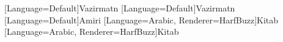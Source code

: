[Language=Default]{Vazirmatn}
[Language=Default]{Vazirmatn}
[Language=Default]{Amiri}
[Language=Arabic, Renderer=HarfBuzz]{Kitab} %
[Language=Arabic, Renderer=HarfBuzz]{Kitab} %

